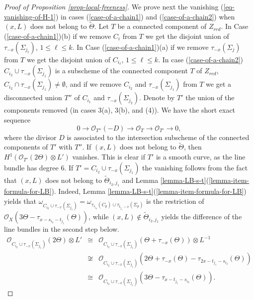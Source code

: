 \documentclass[12pt]{amsart}
\numberwithin{equation}{subsection}
\theoremstyle{plain}
\theoremstyle{definition}
\newcommand{\StructureSheaf}[1]{{\mathcal O}_{#1}}
\begin{document}
\begin{proof}[Proof of Proposition \ref{prop-local-freeness}]
We prove next the vanishing (\ref{eq-vanishing-of-H-1}) in cases (\ref{case-of-a-chain1}) and (\ref{case-of-a-chain2}) when $(x,L)$ does not belong to $\tilde{\Theta}$.
Let $T$ be a connected component of $Z_{red}$.
In Case (\ref{case-of-a-chain1})(b) if we remove $C_i$ from $T$ we get the disjoint union of $\tau_{-x}(\Sigma_{j_\ell})$, $1\leq \ell\leq k$. In Case (\ref{case-of-a-chain1})(a) if we remove $\tau_{-x}(\Sigma_j)$ from $T$ 
we get the disjoint union of $C_{i_\ell}$, $1\leq \ell\leq k$.
In case (\ref{case-of-a-chain2})  $C_{i_2}\cup\tau_{-x}(\Sigma_{j_1})$
is a subscheme of the connected component $T$ of $Z_{red}$,  $C_{i_2}\cap\tau_{-x}(\Sigma_{j_1})\neq\emptyset$,
and if we remove $C_{i_2}$ and $\tau_{-x}(\Sigma_{j_1})$ from $T$ 
we get a disconnected union $T''$ of $C_{i_1}$ and $\tau_{-x}(\Sigma_{j_2})$. Denote by $T'$ the union of the components removed (in cases 3(a), 3(b), and (4)). 
We have the short  exact sequence
\[
0\rightarrow \StructureSheaf{T''}(-D)\rightarrow \StructureSheaf{T}\rightarrow \StructureSheaf{T'}\rightarrow 0,
\]
where the divisor $D$ is associated to the intersection subscheme of the connected components of $T'$ with $T''$.
If  $(x,L)$ does not belong to $\tilde{\Theta}$, then $H^1(\StructureSheaf{T'}(2\Theta)\otimes L')$ vanishes. This is clear if $T'$ is a smooth curve, as the line bundle has degree $6$. If $T'= C_{i_2}\cup\tau_{-x}(\Sigma_{j_1})$ the vanishing follows from the fact that $(x,L)$ does not belong to $\tilde{\Theta}_{i_2,j_1}$ and Lemma \ref{lemma-LB-s-t}(\ref{lemma-item-formula-for-LB}).
Indeed, Lemma \ref{lemma-LB-s-t}(\ref{lemma-item-formula-for-LB}) yields that
$\omega_{C_{i_2}\cup\tau_{-x}(\Sigma_{j_1})}=\omega_{\tau_{s_{i_2}}(C_p)\cup\tau_{t_{j_1}-x}(\Sigma_p)}$ is the restriction of 
$\StructureSheaf{X}(3\Theta-\tau_{x-s_{i_2}-t_{j_1}}(\Theta))$, while $(x,L)\not\in \tilde{\Theta}_{i_2,j_1}$ yields the difference of the line bundles in the second step below.
\begin{eqnarray*}
\StructureSheaf{C_{i_2}\cup\tau_{-x}(\Sigma_{j_1})}(2\Theta)\otimes L' &\cong&
\StructureSheaf{C_{i_2}\cup\tau_{-x}(\Sigma_{j_1})}(\Theta+\tau_{-x}(\Theta))\otimes L^{-1}
\\
&\not\cong &
\StructureSheaf{C_{i_2}\cup\tau_{-x}(\Sigma_{j_1})}(2\Theta+\tau_{-x}(\Theta)-\tau_{2x-t_{j_1}-s_{i_2}}(\Theta))
\\
&\cong &\StructureSheaf{C_{i_2}\cup\tau_{-x}(\Sigma_{j_1})}(3\Theta-\tau_{x-t_{j_1}-s_{i_2}}(\Theta)).
\end{eqnarray*}



\end{proof}
\end{document}
